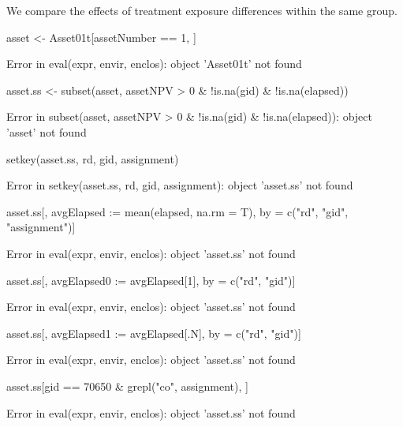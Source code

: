 We compare the effects of treatment exposure differences within the same group.
\begin{Schunk}
\begin{Sinput}
asset <- Asset01t[assetNumber == 1, ]
\end{Sinput}
\begin{Soutput}
Error in eval(expr, envir, enclos): object 'Asset01t' not found
\end{Soutput}
\begin{Sinput}
asset.ss <- subset(asset, assetNPV > 0 & !is.na(gid) & !is.na(elapsed))
\end{Sinput}
\begin{Soutput}
Error in subset(asset, assetNPV > 0 & !is.na(gid) & !is.na(elapsed)): object 'asset' not found
\end{Soutput}
\begin{Sinput}
setkey(asset.ss, rd, gid, assignment)
\end{Sinput}
\begin{Soutput}
Error in setkey(asset.ss, rd, gid, assignment): object 'asset.ss' not found
\end{Soutput}
\begin{Sinput}
asset.ss[, avgElapsed := mean(elapsed, na.rm = T), by = c("rd", "gid", "assignment")]
\end{Sinput}
\begin{Soutput}
Error in eval(expr, envir, enclos): object 'asset.ss' not found
\end{Soutput}
\begin{Sinput}
asset.ss[, avgElapsed0 := avgElapsed[1], by = c("rd", "gid")]
\end{Sinput}
\begin{Soutput}
Error in eval(expr, envir, enclos): object 'asset.ss' not found
\end{Soutput}
\begin{Sinput}
asset.ss[, avgElapsed1 := avgElapsed[.N], by = c("rd", "gid")]
\end{Sinput}
\begin{Soutput}
Error in eval(expr, envir, enclos): object 'asset.ss' not found
\end{Soutput}
\begin{Sinput}
asset.ss[gid == 70650 & grepl("co", assignment), ]
\end{Sinput}
\begin{Soutput}
Error in eval(expr, envir, enclos): object 'asset.ss' not found
\end{Soutput}
\begin{Sinput}

\end{Sinput}
\end{Schunk}
